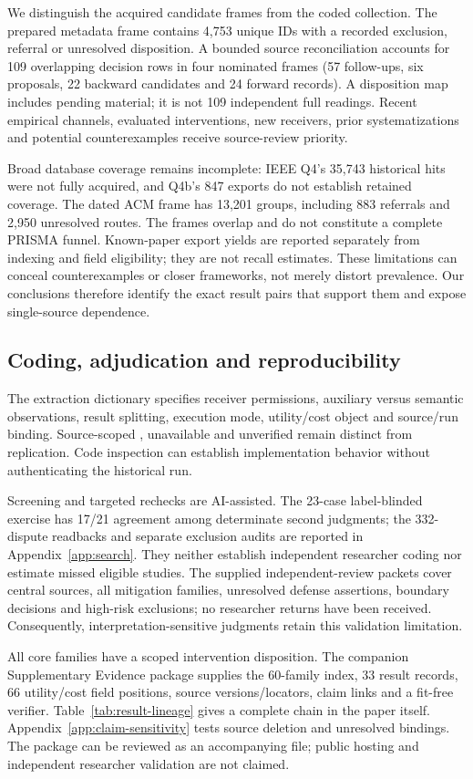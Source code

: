 We distinguish the acquired candidate frames from the coded collection. The prepared metadata frame contains 4,753 unique IDs with a recorded exclusion, referral or unresolved disposition. A bounded source reconciliation accounts for 109 overlapping decision rows in four nominated frames (57 follow-ups, six proposals, 22 backward candidates and 24 forward records). A disposition map includes pending material; it is not 109 independent full readings. Recent empirical channels, evaluated interventions, new receivers, prior systematizations and potential counterexamples receive source-review priority.

Broad database coverage remains incomplete: IEEE Q4's 35,743 historical hits were not fully acquired, and Q4b's 847 exports do not establish retained coverage. The dated ACM frame has 13,201 groups, including 883 referrals and 2,950 unresolved routes. The frames overlap and do not constitute a complete PRISMA funnel. Known-paper export yields are reported separately from indexing and field eligibility; they are not recall estimates. These limitations can conceal counterexamples or closer frameworks, not merely distort prevalence. Our conclusions therefore identify the exact result pairs that support them and expose single-source dependence.

\subsection{Coding, adjudication and reproducibility}
The extraction dictionary specifies receiver permissions, auxiliary versus semantic observations, result splitting, execution mode, utility/cost object and source/run binding. Source-scoped \NRR{}, unavailable \NRA{} and unverified \NRV{} remain distinct from replication. Code inspection can establish implementation behavior without authenticating the historical run.

Screening and targeted rechecks are AI-assisted. The 23-case label-blinded exercise has 17/21 agreement among determinate second judgments; the 332-dispute readbacks and separate exclusion audits are reported in Appendix~\ref{app:search}. They neither establish independent researcher coding nor estimate missed eligible studies. The supplied independent-review packets cover central sources, all mitigation families, unresolved defense assertions, boundary decisions and high-risk exclusions; no researcher returns have been received. Consequently, interpretation-sensitive judgments retain this validation limitation.

All \FinalCore{} core families have a scoped intervention disposition. The companion Supplementary Evidence package supplies the 60-family index, 33 result records, 66 utility/cost field positions, source versions/locators, claim links and a fit-free verifier. Table~\ref{tab:result-lineage} gives a complete chain in the paper itself. Appendix~\ref{app:claim-sensitivity} tests source deletion and unresolved bindings. The package can be reviewed as an accompanying file; public hosting and independent researcher validation are not claimed.
